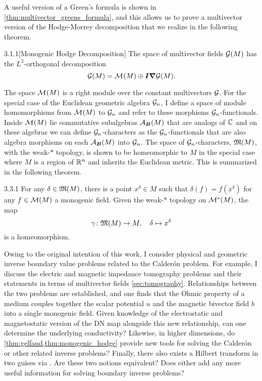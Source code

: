 A useful version of a Green's formula is shown in \cref{thm:multivector_greens_formula}, and this allows us to prove a multivector version of the Hodge-Morrey decomposition that we realize in the following theorem.
\begin{customthm}{3.1.1}[Monogenic Hodge Decomposition]
The space of multivector fields $\mathcal{G}(M)$ has the $L^2$-orthogonal decomposition
\begin{equation}
\mathcal{G}(M) = \mathcal{M}^{}(M) \oplus \boldsymbol{I} \boldsymbol{\nabla} \mathcal{G}(M).
\end{equation}
\end{customthm}

The space $\mathcal{M}^{}(M)$ is a right module over the constant multivectors $\mathcal{G}$. For the special case of the Euclidean geometric algebra $\mathcal{G}_n$, I define a space of module homomorphisms from $\mathcal{M}^{}(M)$ to $\mathcal{G}_n$ and refer to these morphisms $\mathcal{G}_n$-functionals. Inside $\mathcal{M}^{}(M)$ lie commutative subalgebras $\mathcal{A}_{\boldsymbol{B}}(M)$ that are analogs of $\mathbb{C}$ and on these algebras we can define $\mathcal{G}_n$-characters as the $\mathcal{G}_n$-functionals that are also algebra morphisms on each $\mathcal{A}_{\boldsymbol{B}}(M)$ into $\mathcal{G}_n$. The space of $\mathcal{G}_n$-characters, $\mathfrak{M}(M)$, with the weak-$\ast$ topology, is shown to be homeomorphic to $M$ in the special case where $M$ is a region of $\mathbb{R}^n$ and inherits the Euclidean metric. This is summarized in the following theorem.
\begin{customthm}{3.3.1}
For any $\delta \in \mathfrak{M}(M)$, there is a point $x^\delta \in M$ such that $\delta(f) = f(x^\delta)$ for any $f\in \mathcal{M}(M)$ a monogenic field. Given the weak-$\ast$ topology on $\mathcal{M}^*(M)$, the map
\[
\gamma \colon \mathfrak{M}(M) \to M, \quad \delta \mapsto x^\delta
\]
is a homeomorphism. 
\end{customthm}

Owing to the original intention of this work, I consider physical and geometric inverse boundary value problems related to the Calder\'on problem. For example, I discuss the electric and magnetic impedance tomography problems and their statements in terms of multivector fields \cref{sec:tomography}. Relationships between the two problems are established, and one finds that the Ohmic property of a medium couples together the scalar potential $u$ and the magnetic bivector field $b$ into a single monogenic field. Given knowledge of the electrostatic and magnetostatic version of the DN map alongside this new relationship, can one determine the underlying conductivity? Likewise, in higher dimensions, do \cref{thm:gelfand,thm:monogenic_hodge} provide new tools for solving the Calder\'on or other related inverse problems? Finally, there also exists a Hilbert transform in two guises via \cite{belishev_dirichlet_2008,brackx_hilbert_2008}. Are these two notions equivalent? Does either add any more useful information for solving boundary inverse problems?